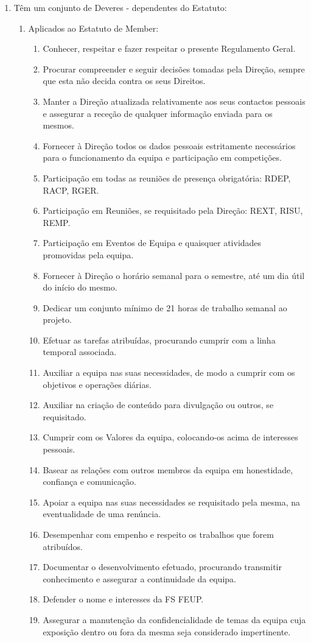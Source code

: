 \begin{enumerate}
  \item Têm um conjunto de Deveres - dependentes do Estatuto:
  \begin{enumerate}
    \item Aplicados ao Estatuto de Member:
    \begin{enumerate}
      \item Conhecer, respeitar e fazer respeitar o presente Regulamento Geral.
      \item Procurar compreender e seguir decisões tomadas pela Direção, sempre que esta não decida contra os seus Direitos.
      \item Manter a Direção atualizada relativamente aos seus contactos pessoais e assegurar a receção de qualquer informação enviada para os mesmos.
      \item Fornecer à Direção todos os dados pessoais estritamente necessários para o funcionamento da equipa e participação em competições.
      \item Participação em todas as reuniões de presença obrigatória: RDEP, RACP, RGER.
      \item Participação em Reuniões, se requisitado pela Direção: REXT, RISU, REMP.
      \item Participação em Eventos de Equipa e quaisquer atividades promovidas pela equipa.
      \item Fornecer à Direção o horário semanal para o semestre, até um dia útil do início do mesmo.
      \item Dedicar um conjunto mínimo de 21 horas de trabalho semanal ao projeto.
      \item Efetuar as tarefas atribuídas, procurando cumprir com a linha temporal associada.
      \item Auxiliar a equipa nas suas necessidades, de modo a cumprir com os objetivos e operações diárias.
      \item Auxiliar na criação de conteúdo para divulgação ou outros, se requisitado.
      \item Cumprir com os Valores da equipa, colocando-os acima de interesses pessoais.
      \item Basear as relações com outros membros da equipa em honestidade, confiança e comunicação.
      \item Apoiar a equipa nas suas necessidades se requisitado pela mesma, na eventualidade de uma renúncia.
      \item Desempenhar com empenho e respeito os trabalhos que forem atribuídos.
      \item Documentar o desenvolvimento efetuado, procurando transmitir conhecimento e assegurar a continuidade da equipa.
      \item Defender o nome e interesses da FS FEUP.
      \item Assegurar a manutenção da confidencialidade de temas da equipa cuja exposição dentro ou fora da mesma seja considerado impertinente.
    \end{enumerate}


\end{enumerate}
\end{enumerate}
